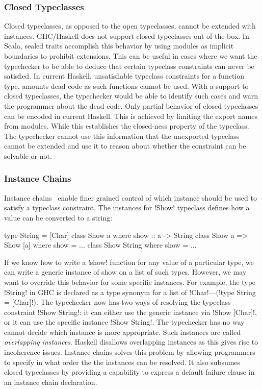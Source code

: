 \documentclass[screen,nonacm,manuscript,review]{acmart} %
\begin{document}
\subsubsection{Closed Typeclasses}
Closed typeclasses, as
opposed to the open typeclasses, cannot be extended with
instances. GHC/Haskell does not support closed typeclasses out of the
box. In Scala, sealed traits accomplish this behavior by using modules
as implicit boundaries to prohibit extensions. This can be useful in
cases where we want the typechecker to be able to deduce that certain
typeclass constraints can never be satisfied. In current Haskell,
unsatisfiable typeclass constraints for a function type, amounts dead
code as such functions cannot be used.
With a support to closed typeclasses, the typechecker would be
able to identify such cases and warn the programmer about the dead code.
Only partial behavior of closed typeclasses can be
encoded in current Haskell. This is achieved by limiting the export
names from modules. While this establishes the closed-ness property of
the typeclass. The typechecker cannot use this information that the
unexported typeclass cannot be extended and use it to reason about
whether the constraint can be solvable or not.

\subsubsection{Instance Chains}
Instance chains~\cite{morris_instance_2010} enable finer grained
control of which instance should be used to satisfy
a typeclass constraint. The instances for !Show! typeclass defines how
a value can be converted to a string:

\begin{CenteredBox}
\begin{code}
type String = [Char]
class Show a where show :: a -> String
class Show a => Show [a] where show = ...
class Show String where show = ...
\end{code}
\end{CenteredBox}
If we know how to write a !show! function for any value of a particular
type, we can write a generic instance of show on a list of such types.
However, we may want to override this behavior for some specific
instances. For example, the type !String! in GHC is declared as a
type synonym for a list of !Char!---(!type String = [Char]!).
The typechecker now has two ways of resolving the typeclass
constraint !Show String!: it can either use the generic instance via
!Show [Char]!, or it can use the specific instance !Show String!. The
typechecker has no way cannot decide which instance is more appropriate.
Such instances are called \emph{overlapping instances}.
Haskell disallows overlapping instances as this gives rise to
incoherence issues\cite{jones_coherence_1993}.
Instance chains solves this problem by allowing programmers
to specify in what order the the instances can be resolved. It also
subsumes closed typeclasses by providing a capability to express
a default failure clause in an instance chain declaration.
\end{document}
